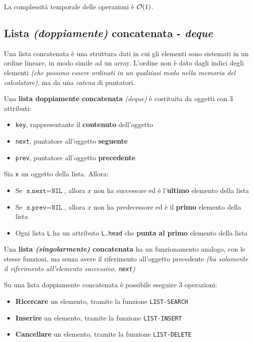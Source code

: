 \documentclass[italian, 10pt]{article}
\begin{document}
La complessità temporale delle operazioni è \(\mathcal{O}(1)\).

\subsection{Lista \textit{(doppiamente)} concatenata - \textit{deque}}
\label{sec:liste-concatenate}

Una lista concatenata è una struttura dati in cui gli elementi sono sistemati in un ordine lineare, in modo simile ad un array.
L'ordine non è dato dagli indici degli elementi \textit{(che possono essere ordinati in un qualsiasi modo nella memoria del calcolatore)}, ma da una \textit{catena} di puntatori.

Una \textbf{lista doppiamente concatenata} \textit{(deque)} è costituita da oggetti con \(3\) attributi:

\begin{itemize}
  \item \texttt{key}, rappresentante il \textbf{contenuto} dell'oggetto
  \item \texttt{next}, puntatore all'oggetto \textbf{seguente}
  \item \texttt{prev}, puntatore all'oggetto \textbf{precedente}
\end{itemize}

Sia \texttt{x} un oggetto della lista.
Allora:

\begin{itemize}
  \item Se \(\texttt{x.next} = \texttt{NIL}\), allora \(x\) non ha successore ed è l'\textbf{ultimo} elemento della lista
  \item Se \(\texttt{x.prev} = \texttt{NIL}\), allora \(x\) non ha predecessore ed è il \textbf{primo} elemento della lista
  \item Ogni lista \texttt{L} ha un attributo \texttt{L.head} che \textbf{punta al primo} elemento della lista
\end{itemize}

Una \textbf{lista \textit{(singolarmente)} concatenata} ha un funzionamento analogo, con le stesse funzioni, ma senza avere il riferimento all'oggetto precedente \textit{(ha solamente il riferimento all'elemento successivo, \texttt{next})}

\bigskip
Su una lista doppiamente concatenata è possibile eseguire \(3\) operazioni:

\begin{itemize}
  \item \textbf{Ricercare} un elemento, tramite la funzione \texttt{LIST-SEARCH}
  \item \textbf{Inserire} un elemento, tramite la funzione \texttt{LIST-INSERT}
  \item \textbf{Cancellare} un elemento, tramite la funzione \texttt{LIST-DELETE}
\end{itemize}
\end{document}
